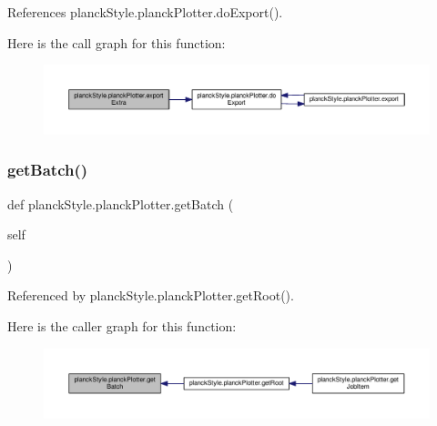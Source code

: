 References planck\+Style.\+planck\+Plotter.\+do\+Export().

Here is the call graph for this function\+:
\nopagebreak
\begin{figure}[H]
\begin{center}
\leavevmode
\includegraphics[width=350pt]{classplanckStyle_1_1planckPlotter_a0097bf752f839ecc435362ff049c751e_cgraph}
\end{center}
\end{figure}
\mbox{\label{classplanckStyle_1_1planckPlotter_ab9158e2b20b79b95d140e172c0054574}} 
\subsubsection{\texorpdfstring{get\+Batch()}{getBatch()}}
{\footnotesize\ttfamily def planck\+Style.\+planck\+Plotter.\+get\+Batch (\begin{DoxyParamCaption}\item[{}]{self }\end{DoxyParamCaption})}



Referenced by planck\+Style.\+planck\+Plotter.\+get\+Root().

Here is the caller graph for this function\+:
\nopagebreak
\begin{figure}[H]
\begin{center}
\leavevmode
\includegraphics[width=350pt]{classplanckStyle_1_1planckPlotter_ab9158e2b20b79b95d140e172c0054574_icgraph}
\end{center}
\end{figure}
\mbox{\label{classplanckStyle_1_1planckPlotter_a5a2ce78f310b8ca51fc307a1c66c5e6d}} 
